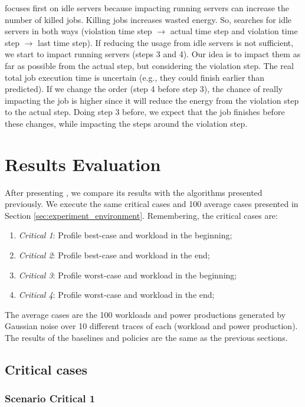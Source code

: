 \emph{\systemName} focuses first on idle servers because impacting running servers can increase the number of killed jobs. Killing jobs increases wasted energy. So, \emph{\systemName} searches for idle servers in both ways (violation time step $\rightarrow$ actual time step and violation time step $\rightarrow$ last time step). If reducing the usage from idle servers is not sufficient, we start to impact running servers (steps 3 and 4). Our idea is to impact them as far as possible from the actual step, but considering the violation step. The real total job execution time is uncertain (e.g., they could finish earlier than predicted). If we change the order (step 4 before step 3), the chance of really impacting the job is higher since it will reduce the energy from the violation step to the actual step. Doing step 3 before, we expect that the job finishes before these changes, while impacting the steps around the violation step. 

\section{Results Evaluation}

After presenting \emph{\systemName}, we compare its results with the algorithms presented previously. We execute the same critical cases and 100 average cases presented in Section \ref{sec:experiment_environment}. Remembering, the critical cases are:
\begin{enumerate}
    \item \emph{Critical 1}: Profile best-case and workload in the beginning;
    \item \emph{Critical 2}: Profile best-case and workload in the end;
    \item \emph{Critical 3}: Profile worst-case and workload in the beginning;
    \item \emph{Critical 4}: Profile worst-case and workload in the end;
\end{enumerate}

The average cases are the 100 workloads and power productions generated by Gaussian noise over 10 different traces of each (workload and power production). The results of the baselines and policies are the same as the previous sections.

\subsection{Critical cases}

\subsubsection{Scenario Critical 1}

